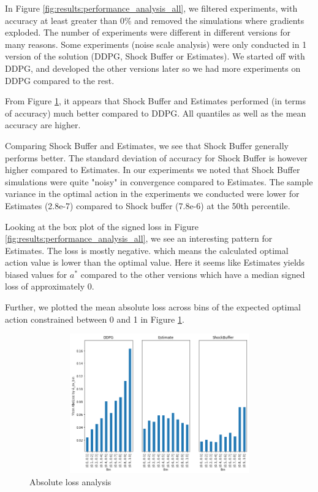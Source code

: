 In Figure \ref{fig:results:performance_analysis_all}, we filtered experiments, with accuracy at least greater than 0\% and removed the simulations where gradients exploded. The number of experiments were different in different versions for many reasons. Some experiments (noise scale analysis) were only conducted in 1 version of the solution (DDPG, Shock Buffer or Estimates). We started off with DDPG, and developed the other versions later so we had more experiments on DDPG compared to the rest.

From Figure \ref{fig:results:AbsAExAnalysis}, it appears that Shock Buffer and Estimates performed (in terms of accuracy) much better compared to DDPG.    All quantiles as well as the mean accuracy are higher.

Comparing Shock Buffer and Estimates, we see that Shock Buffer generally performs better. The standard deviation of accuracy for Shock Buffer is however higher compared to Estimates. In our experiments we noted that Shock Buffer simulations were quite "noisy" in convergence compared to Estimates. The sample variance in the optimal action in the experiments we conducted were lower for Estimates (2.8e-7) compared to Shock buffer (7.8e-6) at the 50th percentile.

Looking at the box plot of the signed loss in Figure \ref{fig:results:performance_analysis_all}, we see an interesting pattern for Estimates. The loss is mostly negative. which means the calculated optimal action value is lower than the optimal value. Here it seems like Estimates yields biased values for $a^*$ compared to the other versions which have a median signed loss of approximately 0.

Further, we plotted the mean absolute loss across bins of the expected optimal action constrained between 0 and 1 in Figure \ref{fig:results:AbsAExAnalysis}. 
\begin{figure}[htpb]
  \includegraphics[width=1\textwidth,height=6cm]{figures/Results/AbsLossA_ex.png}
  \caption[Absolute loss analysis]{Absolute loss analysis} \label{fig:results:AbsAExAnalysis}
\end{figure}

